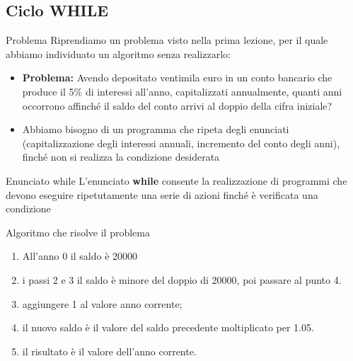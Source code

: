 \subsection*{Ciclo WHILE}
\begin{frame}
\begin{block}{Problema}
Riprendiamo un problema visto nella prima lezione, per il quale abbiamo individuato un algoritmo senza realizzarlo:
\begin{itemize}
\item \textbf{Problema:} Avendo depositato ventimila euro in un conto bancario che produce il 5\% di interessi all'anno, capitalizzati 
annualmente, quanti anni occorrono affinché il saldo del conto arrivi al doppio della cifra iniziale?
\item Abbiamo bisogno di un programma che ripeta degli enunciati (capitalizzazione degli interessi annuali, incremento del conto degli 
anni), finché non si realizza la condizione desiderata
\end{itemize}	
\end{block}
\end{frame}

\begin{frame}
\begin{block}{Enunciato while}
L'enunciato \textbf{while} consente la realizzazione di programmi che devono eseguire ripetutamente una serie di azioni finché è 
verificata una condizione
\end{block}
\begin{block}{Algoritmo che risolve il problema}
\begin{enumerate}
\item All'anno 0 il saldo è 20000
\item \textbf{} i passi 2 e 3 \textbf{} il saldo è minore del doppio di 20000, poi passare al punto 4.
\item aggiungere 1 al valore anno corrente;
\item il nuovo saldo è il valore del saldo precedente moltiplicato per 1.05.
\item il risultato è il valore dell'anno corrente.
\end{enumerate}
\end{block}
\end{frame}

